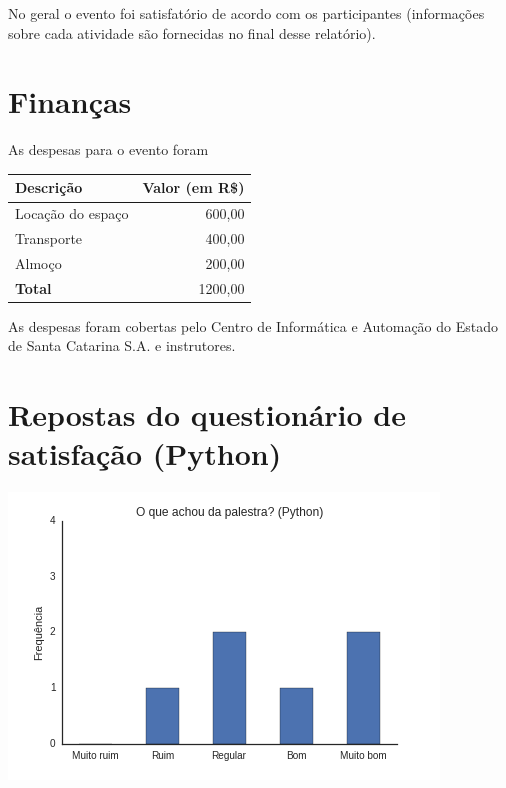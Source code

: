 \documentclass[12pt]{article}
\begin{document}
No geral o evento foi satisfatório de acordo com os participantes
(informações sobre cada atividade são fornecidas no final desse relatório).

\newpage

\section*{Finanças}

As despesas para o evento foram

\begin{tabular}{p{}r}
  \textbf{Descrição} & \textbf{Valor} (em R\$) \\\hline
  Locação do espaço & 600,00 \\
  Transporte\footnotemark & 400,00 \\
  Almoço\footnotemark  & 200,00 \\\hline
  \textbf{Total} & 1200,00
\end{tabular}
\setcounter{footnote}{1}
\addtocounter{footnote}{1}

As despesas foram cobertas pelo Centro de Informática e Automação do Estado de Santa Catarina
S.A. e instrutores.

\newpage

\section*{Repostas do questionário de satisfação (Python)}

\begin{center}
    \includegraphics[height=0.25\textheight]{images/python1.png}
\end{center}
\end{document}
